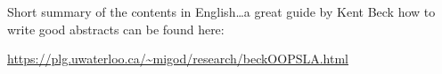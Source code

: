 
{}

\begingroup
\let\clearpage\relax
\let\cleardoublepage\relax
\let\cleardoublepage\relax

\thispagestyle{plain}
\vspace*{-2.2cm}

\begin{center}
    \spacedlowsmallcaps{\myUni}

    \vspace*{0.2cm}

    {\color{CTtitle}\spacedallcaps{\myTitle}}

    {
    \color{darkgray}
    \vspace*{0.2cm}

    \spacedlowsmallcaps{\myName}
    \vspace*{-3mm}

    \spacedlowsmallcaps{\myDegree}
    \vspace*{-3mm}

    \spacedlowsmallcaps{\myTime}
    }

    \vspace*{0.3cm}
\end{center}


\noindent
Short summary of the contents in English\dots a great guide by
Kent Beck how to write good abstracts can be found here:
%
\begin{center}
    \url{https://plg.uwaterloo.ca/~migod/research/beckOOPSLA.html}
\end{center}

\vfill


\endgroup

\vfill
